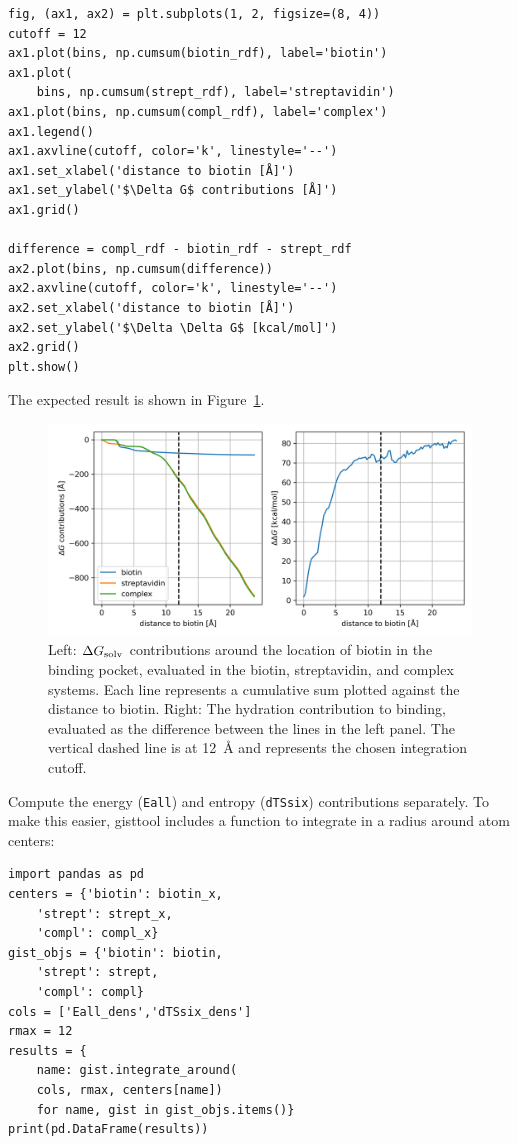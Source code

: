\documentclass[9pt,tutorial]{livecoms}
\newcommand{\dgsolv}{\Delta G_\textup{solv}}
\newcommand\inlinecode{\texttt}
\begin{document}
\begin{lstlisting}[style=python]
fig, (ax1, ax2) = plt.subplots(1, 2, figsize=(8, 4))
cutoff = 12
ax1.plot(bins, np.cumsum(biotin_rdf), label='biotin')
ax1.plot(
    bins, np.cumsum(strept_rdf), label='streptavidin')
ax1.plot(bins, np.cumsum(compl_rdf), label='complex')
ax1.legend()
ax1.axvline(cutoff, color='k', linestyle='--')
ax1.set_xlabel('distance to biotin [Å]')
ax1.set_ylabel('$\Delta G$ contributions [Å]')
ax1.grid()

difference = compl_rdf - biotin_rdf - strept_rdf
ax2.plot(bins, np.cumsum(difference))
ax2.axvline(cutoff, color='k', linestyle='--')
ax2.set_xlabel('distance to biotin [Å]')
ax2.set_ylabel('$\Delta \Delta G$ [kcal/mol]')
ax2.grid()
plt.show()
\end{lstlisting}
The expected result is shown in Figure~\ref{fig-dg-sums}.
\begin{figure}[H]
	\centering
	\includegraphics[width=1.0\linewidth]{figures/deltaG-difference.png}
	\caption{Left: $\dgsolv$ contributions around the location of biotin in the binding pocket, evaluated in the biotin, streptavidin, and complex systems. Each line represents a cumulative sum plotted against the distance to biotin. Right: The hydration contribution to binding, evaluated as the difference between the lines in the left panel. The vertical dashed line is at \SI{12}{\angstrom} and represents the chosen integration cutoff.}\label{fig-dg-sums}
\end{figure}
Compute the energy (\inlinecode{Eall}) and entropy (\inlinecode{dTSsix}) contributions separately.
 To make this easier, gisttool includes a function to integrate in a radius around atom centers:
\begin{lstlisting}[style=python]
import pandas as pd
centers = {'biotin': biotin_x, 
    'strept': strept_x, 
    'compl': compl_x}
gist_objs = {'biotin': biotin, 
    'strept': strept, 
    'compl': compl}
cols = ['Eall_dens','dTSsix_dens']
rmax = 12
results = {
    name: gist.integrate_around(
    cols, rmax, centers[name])
    for name, gist in gist_objs.items()}
print(pd.DataFrame(results))
\end{lstlisting}
\end{document}
